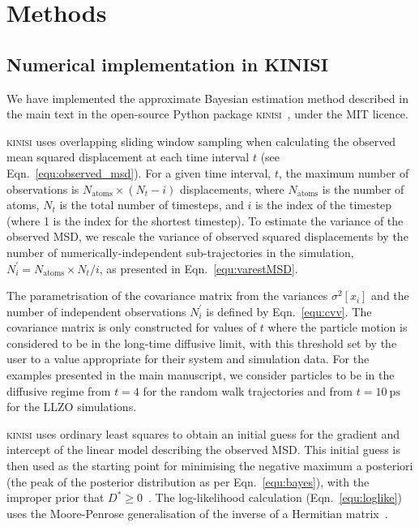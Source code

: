\documentclass[reprint,superscriptaddress,nobibnotes,amsmath,amssymb,aps,prx,hidelinks,linenumbers]{revtex4-2}
\newcommand{\oMSDi}{\ensuremath{x_i}}
\newcommand{\nind}[1]{\ensuremath{N^\prime_{#1}}}
\newcommand{\D}{\ensuremath{D^*}}
\newcommand{\var}[1]{\ensuremath{\sigma^2[#1]}}
\begin{document}
\section{Methods}

\subsection{Numerical implementation in KINISI}
\label{sec:implementation}
We have implemented the approximate Bayesian estimation method described in the main text in the open-source Python package \textsc{kinisi}~\cite{mccluskey_kinisi_2022}, under the MIT licence. 

\textsc{kinisi} uses overlapping sliding window sampling when calculating the observed mean squared displacement at each time interval $t$ (see Eqn.~\ref{equ:observed_msd}).
For a given time interval, $t$, the maximum number of observations is $N_{\mathrm{atoms}} \times (N_{t} - i)$ displacements, where $N_{\mathrm{atoms}}$ is the number of atoms, $N_{t}$ is the total number of timesteps, and $i$ is the index of the timestep (where \num{1} is the index for the shortest timestep).
To estimate the variance of the observed MSD, we rescale the variance of observed squared displacements by the number of numerically-independent sub-trajectories in the simulation, $\nind{i} = N_{\mathrm{atoms}} \times N_{t} / i$, as presented in Eqn.~\ref{equ:varestMSD}.  

The parametrisation of the covariance matrix from the variances $\var{\oMSDi}$ and the number of independent observations $\nind{i}$ is defined by Eqn.~\ref{equ:cvv}. 
The covariance matrix is only constructed for values of $t$ where the particle motion is considered to be in the long-time diffusive limit, with this threshold set by the user to a value appropriate for their system and simulation data. 
For the examples presented in the main manuscript, we consider particles to be in the diffusive regime from $t=\num{4}$ for the random walk trajectories and from $t=\SI{10}{\pico\second}$ for the LLZO simulations.

\textsc{kinisi} uses ordinary least squares to obtain an initial guess for the gradient and intercept of the linear model describing the observed MSD.
This initial guess is then used as the starting point for minimising the negative maximum a posteriori (the peak of the posterior distribution as per Eqn.~\ref{equ:bayes}), with the improper prior that $\D \ge 0$~\cite{broyden_convergence_1970,fletcher_new_1970,goldfarb_family_1970,shanno_conditioning_1970}.
The log-likelihood calculation (Eqn.~\ref{equ:loglike}) uses the Moore-Penrose generalisation of the inverse of a Hermitian matrix~\cite{moore_on_1920,bjerhammar_application_1951,penrose_generlized_1955}. 
\end{document}
